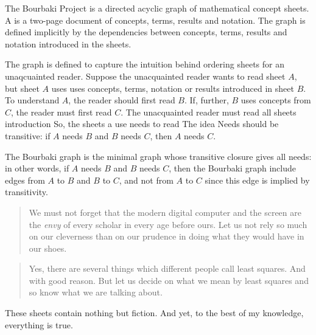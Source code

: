 
\sbasic

\sstart
{}

The Bourbaki Project is a directed acyclic graph of
mathematical concept sheets.
A  is a two-page document of
concepts, terms, results and notation.
The graph is defined implicitly by
the dependencies between concepts, terms,
results and notation introduced in the sheets.

The graph is defined to capture the intuition
behind ordering sheets for an unaqcuainted reader.
Suppose the unacquainted reader wants to read sheet
$A$, but sheet $A$ uses
uses concepts, terms,
notation or results introduced in sheet $B$.
To understand $A$, the reader should first read $B$.
If, further, $B$ uses concepts from $C$, the reader
must first read $C$.
The unacquainted reader must read all
sheets introduction
So, the sheets a use needs to read
The idea
Needs should be transitive: if $A$ needs
$B$ and $B$ needs $C$, then $A$ needs $C$.


The Bourbaki graph is the minimal graph
whose transitive closure gives all
needs: in other words, if $A$ needs $B$
and $B$ needs $C$, then the Bourbaki
graph include edges from $A$ to $B$ and
$B$ to $C$, and not from $A$ to $C$ since
this edge is implied by transitivity.

\begin{quote}
We must not forget that the
modern digital computer and
the screen are the \textit{envy} of
every scholar in every age
before ours. Let us not rely
so much
on our cleverness
than on our prudence in doing
what they would have in our shoes.
\end{quote}

\begin{quote}
Yes, there are several things
which different people call
least squares. And with good
reason. But let us decide on
what we mean by least squares
and so know what we are talking
about.
\end{quote}

These sheets contain nothing
but fiction. And yet, to the best
of my knowledge, everything
is true.

\strats
